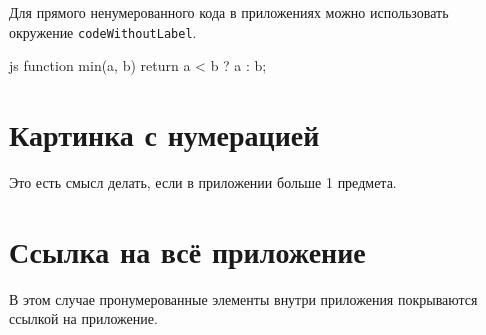 \documentclass[a4paper,12pt]{report}
\begin{document}
Для прямого ненумерованного кода в приложениях можно использовать окружение \verb|codeWithoutLabel|.

\begin{codeWithoutLabel}{js}
function min(a, b) {
  return a < b ? a : b;
}
\end{codeWithoutLabel}

\section{Картинка с нумерацией}\label{numbered_appendix}

Это есть смысл делать, если в приложении больше 1 предмета.



\section{Ссылка на всё приложение}\label{whole_appendix_reference}

В этом случае пронумерованные элементы внутри приложения покрываются ссылкой на приложение.





\end{document}
